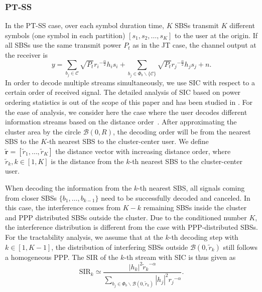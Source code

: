 \documentclass[twocolumns,10pt]{IEEEtran}
\begin{document}
\subsubsection{PT-SS}
\label{PT}
In the PT-SS case, over each symbol duration time, $K$ SBSs transmit $K$ different symbols (one symbol in each partition) $[s_1, s_2, \ldots, s_K]$ to the user at the origin. If all SBSs use the same transmit power $P_t$ as in the JT case, the channel output at the receiver is
\begin{equation}
y=\sum\limits_{b_j\in \mathcal{C}} \sqrt{P_t} {r_i}^{-\frac{\alpha}{2}} h_i s_{i} +\sum_{b_j\in \Phi_b \backslash \{\mathcal{C}\} } \sqrt{P_t} {r_j}^{-\frac{\alpha}{2}} h_j s_j+n.
\end{equation} 
In order to decode multiple streams simultaneously, we use SIC with respect to a certain order of received signal.
The detailed analysis of SIC based on power ordering statistics is out of the scope of this paper and has been studied in \cite{zhang2014}. For the ease of analysis, we consider here the case where the user decodes different information streams based on the distance order~\cite{successive_ic}. After approximating the cluster area by the circle $\mathcal{B}(0, R)$, the decoding order will be from the nearest SBS to the $K$-th nearest SBS to the cluster-center user.
We define $\widetilde{\mathbf{r}}=[\widetilde{r}_1, \ldots, \widetilde{r}_K]$ the distance vector with increasing distance order, where $\widetilde{r}_k, k\in[1,K]$ is the distance from the $k$-th nearest SBS to the cluster-center user. 

When decoding the information from the $k$-th nearest SBS, all signals coming from closer SBSs $\{b_1,\ldots, b_{k-1}\}$ need to be successfully decoded and canceled.
In this case, the interference comes from $K-k$ remaining SBSs inside the cluster and PPP distributed SBSs outside the cluster. Due to the conditioned number $K$, the interference distribution is different from the case with PPP-distributed SBSs.
For the tractability analysis, we assume that at the $k$-th decoding step with $k\in[1, K-1]$, the distribution of interfering SBSs outside $\mathcal{B}(0, \widetilde{r}_k)$ still follows a homogeneous PPP. The SIR of the $k$-th stream with SIC is thus given as
\begin{equation}
\text{SIR}_{k}\simeq\frac{\left|h_k\right|^2 {\widetilde{r}_k}^{-\alpha}}{\sum\limits_{b_j\in \Phi_b \backslash \mathcal{B}(0, \widetilde{r}_k)} |h_j|^2 {r_j}^{-\alpha}}.
\label{PTSS_approximation}
\end{equation} 
\end{document}
